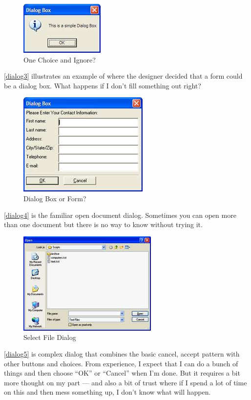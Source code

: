 \begin{figure}
\centerline{
\includegraphics[scale=.5]{chapter8.tex/dialog2}
}
\caption{One Choice and Ignore?}
\label{dialog2}
\end{figure}


 \autoref{dialog3}  illustrates an example of where the designer decided that a form could be a dialog box. What happens if I don't fill something out right?


\begin{figure}
\centerline{
\includegraphics[scale=.5]{chapter8.tex/dialog3}
}
\caption{Dialog Box or Form?}
\label{dialog3}
\end{figure}


 \autoref{dialog4}  is the familiar open document dialog. Sometimes you can open more than one document but there is no way to know without trying it.


\begin{figure}
\centerline{
\includegraphics[scale=.5]{chapter8.tex/dialog4}
}
\caption{Select File Dialog}
\label{dialog4}
\end{figure}


 \autoref{dialog5}  is complex dialog that combines the basic cancel, accept pattern with other buttons and choices. From experience, I expect that I can do a bunch of things and then choose ``OK'' or ``Cancel'' when I'm done. But it requires a bit more thought on my part --- and also a bit of trust where if I spend a lot of time on this and then mess something up, I don't know what will happen.



